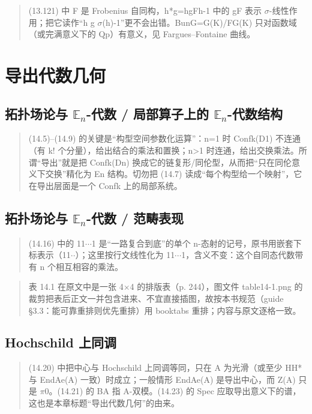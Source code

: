 \begin{quote}\small
(13.121) 中 F 是 Frobenius 自同构，h*g=hgFh-1 中的 gF 表示 $\sigma$-线性作用；把它读作“h g $\sigma$(h)-1”更不会出错。BunG=G(K)/FG(K) 只对函数域（或完满意义下的 Qp）有意义，见 Fargues–Fontaine 曲线。
\end{quote}

\section{导出代数几何}
\subsection*{拓扑场论与 $\mathbb{E}_n$-代数 / 局部算子上的 $\mathbb{E}_n$-代数结构}
\begin{quote}\small
(14.5)--(14.9) 的关键是“构型空间参数化运算”：n=1 时 Confk(D1) 不连通（有 k! 个分量），给出结合的乘法和置换；n>1 时连通，给出交换乘法。所谓“导出”就是把 Confk(Dn) 换成它的链复形/同伦型，从而把“只在同伦意义下交换”精化为 En 结构。切勿把 (14.7) 读成“每个构型给一个映射”，它在导出层面是一个 Confk 上的局部系统。
\end{quote}

\subsection*{拓扑场论与 $\mathbb{E}_n$-代数 / 范畴表现}
\begin{quote}\small
(14.16) 中的 11$\cdots$1 是“一路复合到底”的单个 n-态射的记号，原书用嵌套下标表示（11$\cdot$$\cdot$）；这里按行文线性化为 11$\cdots$1，含义不变：这个自同态代数带有 n 个相互相容的乘法。
\end{quote}

\begin{quote}\small
表 14.1 在原文中是一张 4$\times$4 的排版表（p. 244），图文件 table14-1.png 的裁剪把表后正文一并包含进来、不宜直接插图，故按本书规范（guide §3.3：能可靠重排则优先重排）用 booktabs 重排；内容与原文逐格一致。
\end{quote}

\subsection*{Hochschild 上同调}
\begin{quote}\small
(14.20) 中把中心与 Hochschild 上同调等同，只在 A 为光滑（或至少 HH* 与 EndAe(A) 一致）时成立；一般情形 EndAe(A) 是导出中心，而 Z(A) 只是 $\pi$0。(14.21) 的 BA 指 A-双模。(14.23) 的 Spec 应取导出意义下的谱，这也是本章标题“导出代数几何”的由来。
\end{quote}

